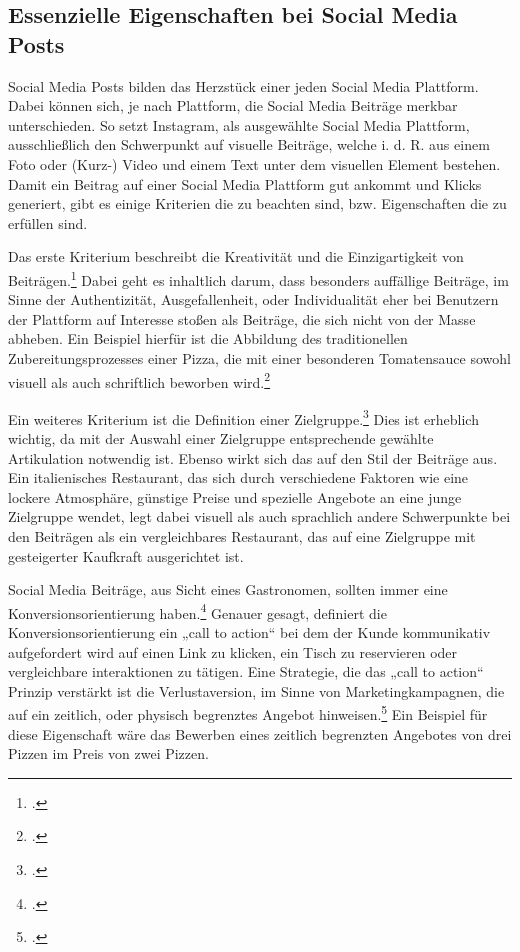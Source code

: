 \subsection{Essenzielle Eigenschaften bei Social Media Posts}
Social Media Posts bilden das Herzstück einer jeden Social Media Plattform.
Dabei können sich, je nach Plattform, die Social Media Beiträge merkbar unterschieden.
So setzt Instagram, als ausgewählte Social Media Plattform, ausschließlich den Schwerpunkt auf visuelle Beiträge, welche i. d. R. aus einem Foto oder (Kurz-) Video und einem Text unter dem visuellen Element bestehen.
Damit ein Beitrag auf einer Social Media Plattform gut ankommt und Klicks generiert, gibt es einige Kriterien die zu beachten sind, bzw. Eigenschaften die zu erfüllen sind.

Das erste Kriterium beschreibt die Kreativität und die Einzigartigkeit von Beiträgen.\footcite{kaplan_users_2010,keller_building_1993}
Dabei geht es inhaltlich darum, dass besonders auffällige Beiträge, im Sinne der Authentizität, Ausgefallenheit, oder Individualität eher bei Benutzern der Plattform auf Interesse stoßen als Beiträge, die sich nicht von der Masse abheben.
Ein Beispiel hierfür ist die Abbildung des traditionellen Zubereitungsprozesses einer Pizza, die mit einer besonderen Tomatensauce sowohl visuell als auch schriftlich beworben wird.\footcite{green_role_2000}

Ein weiteres Kriterium ist die Definition einer Zielgruppe.\footcite{kotler_marketing_management}
Dies ist erheblich wichtig, da mit der Auswahl einer Zielgruppe entsprechende gewählte Artikulation notwendig ist.
Ebenso wirkt sich das auf den Stil der Beiträge aus.
Ein italienisches Restaurant, das sich durch verschiedene Faktoren wie eine lockere Atmosphäre, günstige Preise und spezielle Angebote an eine junge Zielgruppe wendet, legt dabei visuell als auch sprachlich andere Schwerpunkte bei den Beiträgen als ein vergleichbares Restaurant, das auf eine Zielgruppe mit gesteigerter Kaufkraft ausgerichtet ist.

Social Media Beiträge, aus Sicht eines Gastronomen, sollten immer eine Konversionsorientierung haben.\footcite{website_quality_customer_satisfaction}
Genauer gesagt, definiert die Konversionsorientierung ein „call to action“ bei dem der Kunde kommunikativ aufgefordert wird auf einen Link zu klicken, ein Tisch zu reservieren oder vergleichbare interaktionen zu tätigen.
Eine Strategie, die das „call to action“ Prinzip verstärkt ist die Verlustaversion, im Sinne von Marketingkampagnen, die auf ein zeitlich, oder physisch begrenztes Angebot hinweisen.\footcite{jstor_example}
Ein Beispiel für diese Eigenschaft wäre das Bewerben eines zeitlich begrenzten Angebotes von drei Pizzen im Preis von zwei Pizzen.

